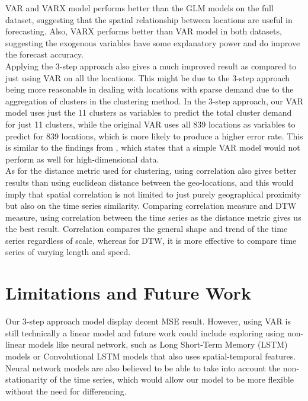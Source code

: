 \documentclass[nonblindrev,msom]{informs3} %
\begin{document}
\noindent VAR and VARX model performs better than the GLM models on the full dataset, suggesting that the spatial relationship between locations are useful in forecasting. Also, VARX performs better than VAR model in both datasets, suggesting the exogenous variables have some explanatory power and do improve the forecast accuracy. \\

\noindent Applying the 3-step approach also gives a much improved result as compared to just using VAR on all the locations. This might be due to the 3-step approach being more reasonable in dealing with locations with sparse demand due to the aggregation of clusters in the clustering method. In the 3-step approach, our VAR model uses just the 11 clusters as variables to predict the total cluster demand for just 11 clusters, while the original VAR uses all 839 locations as variables to predict for 839 locations, which is more likely to produce a higher error rate. This is similar to the findings from \cite{Abolfazl2017}, which states that a simple VAR model would not perform as well for high-dimensional data. \\

\noindent As for the distance metric used for clustering, using correlation also gives better results than using euclidean distance between the geo-locations, and this would imply that spatial correlation is not limited to just purely geographical proximity but also on the time series similarity. Comparing correlation measure and DTW measure, using correlation between the time series as the distance metric gives us the best result. Correlation compares the general shape and trend of the time series regardless of scale, whereas for DTW, it is more effective to compare time series of varying length and speed. 

\section{Limitations and Future Work}
Our 3-step approach model display decent MSE result. However, using VAR is still technically a linear model and future work could include exploring using non-linear models like neural network, such as Long Short-Term Memory (LSTM) models or Convolutional LSTM models that also uses spatial-temporal features. Neural network models are also believed to be able to take into account the non-stationarity of the time series, which would allow our model to be more flexible without the need for differencing. \\
\end{document}
